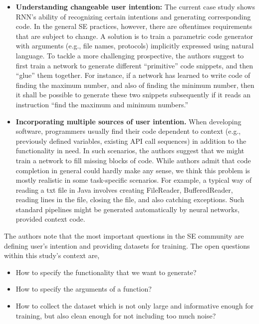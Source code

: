 \documentclass[conference, onecolumn, a4, 12pt]{IEEEtran}
\begin{document}
\begin{itemize}
	\item \textbf{Understanding changeable user intention:} The current case study shows RNN’s ability of recognizing certain intentions and generating corresponding code. In the general SE practices, however, there are oftentimes requirements that are subject to change. A solution is to train a parametric code generator with arguments (e.g., file names, protocols) implicitly
	expressed using natural language. To tackle
	a more challenging prospective, the authors suggest to first train
	a network to generate different “primitive” code snippets,
	and then “glue” them together. For instance, if a network has learned to write code of finding the maximum number, and also of finding the minimum
	number, then it shall be possible to generate these two
	snippets subsequently if it reads an instruction “find
	the maximum and minimum numbers.”
	\item \textbf{Incorporating multiple sources of user intention.} When
	developing software, programmers usually find their code dependent to context (e.g., previously defined variables, existing API call sequences) in addition to the functionality in need. In such scenarios, the authors suggest that we might train a network to fill missing blocks of code. While authors admit that code completion in general could hardly
	make any sense, we think this problem is mostly realistic in some task-specific scenarios. For example, a typical way of reading a txt file in Java involves creating FileReader, BufferedReader, reading lines in
	the file, closing the file, and also catching exceptions.
	Such standard pipelines might be generated automatically
	by neural networks, provided context code.
\end{itemize}

The authors note that the most important questions in the SE community are defining user’s intention and providing datasets for training. The open questions within this study's context are,
\begin{itemize}
	\item How to specify the functionality that we want to generate? 
	\item How to specify the arguments of a function? 
	\item How to collect the dataset which is not only large and informative
	enough for training, but also clean enough for not including
	too much noise?
\end{itemize}
\end{document}
